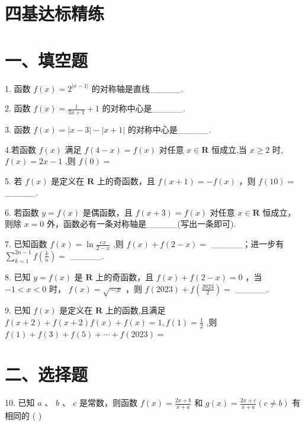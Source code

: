 \section*{四基达标精练}

\section*{一、填空题}

1. 函数 $f\left( x\right)  = {2}^{\left| x - 1\right| }$ 的对称轴是直线\_\_\_\_\_.

2. 函数 $f\left( x\right)  = \frac{1}{{3x} + 1} + 1$ 的对称中心是\_\_\_\_\_.

3. 函数 $f\left( x\right)  = \left| {x - 3}\right|  - \left| {x + 1}\right|$ 的对称中心是\_\_\_\_\_.

4.若函数 $f\left( x\right)$ 满足 $f\left( {4 - x}\right)  = f\left( x\right)$ 对任意 $x \in  \mathbf{R}$ 恒成立,当 $x \geq  2$ 时, $f\left( x\right)  = {2x} - 1$ ,则 $f\left( 0\right)  =$

5. 若 $f\left( x\right)$ 是定义在 $\mathbf{R}$ 上的奇函数，且 $f\left( {x + 1}\right)  =  - f\left( x\right)$ ，则 $f\left( {10}\right)  =$ \_\_\_\_\_.

6. 若函数 $y = f\left( x\right)$ 是偶函数，且 $f\left( {x + 3}\right)  = f\left( x\right)$ 对任意 $x \in  \mathbf{R}$ 恒成立，则除 $x = 0$ 外，函数必有一条对称轴是\_\_\_\_\_(写出一条即可).

7. 已知函数 $f\left( x\right)  = \ln \frac{ex}{2 - x}$ ,则 $f\left( x\right)  + f\left( {2 - x}\right)  =$ \_\_\_\_\_；进一步有 $\mathop{\sum }\limits_{{k = 1}}^{{{2n} - 1}}f\left( \frac{k}{n}\right)  =$ \_\_\_\_\_.

8. 已知 $y = f\left( x\right)$ 是 $\mathbf{R}$ 上的奇函数，且 $f\left( x\right)  + f\left( {2 - x}\right)  = 0$ ，当 $- 1 < x < 0$ 时， $f\left( x\right)  = \sqrt{-x}$ ，则 $f\left( {2023}\right)  + f\left( \frac{2023}{2}\right)  =$ \_\_\_\_\_.

9. 已知 $f\left( x\right)$ 是定义在 $\mathbf{R}$ 上的函数,且满足 $f\left( {x + 2}\right)  + f\left( {x + 2}\right) f\left( x\right)  + f\left( x\right)  = 1,f\left( 1\right)  = \frac{1}{2}$ ,则 $f\left( 1\right)  +  f\left( 3\right)  + f\left( 5\right)  + \cdots  + f\left( {2023}\right)  =$

\section*{二、选择题}

10. 已知 $a$ 、 $b$ 、 $c$ 是常数，则函数 $f\left( x\right)  = \frac{{2x} + b}{x + a}$ 和 $g\left( x\right)  = \frac{{2x} + c}{x + a}\left( {c \neq  b}\right)$ 有相同的 ( )

